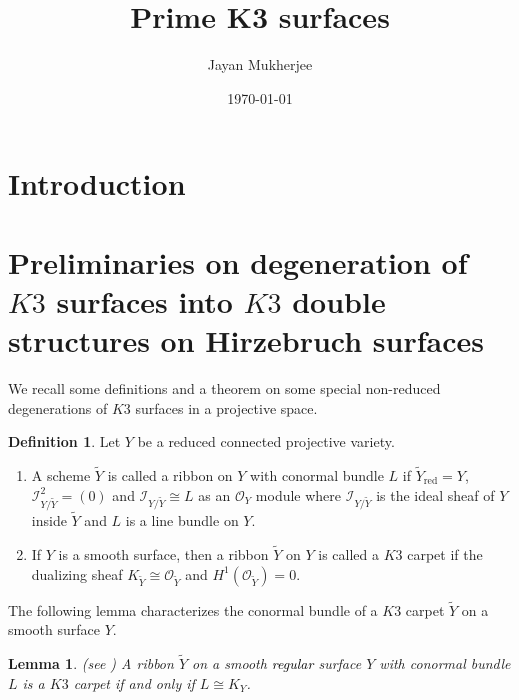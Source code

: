 \documentclass[11pt,reqno]{amsart}
\title{Prime K3 surfaces}
\author{Jayan Mukherjee}
\date{\today}
\theoremstyle{plain}
\newtheorem{lemma}[theorem]{Lemma}
\theoremstyle{definition}
\newtheorem{definition}[theorem]{Definition}
\begin{document}
\begin{abstract}
\end{abstract}

\maketitle

\section{Introduction}


\section{Preliminaries on degeneration of $K3$ surfaces into $K3$ double structures on Hirzebruch surfaces}

We recall some definitions and a theorem on some special non-reduced degenerations of $K3$ surfaces in a projective space.

\begin{definition}\label{ribbon}
Let $Y$ be a reduced connected projective variety.
 \begin{enumerate}
     \item A scheme $\widetilde{Y}$ is called a ribbon on $Y$ with conormal bundle $L$ if $\widetilde{Y}_{\operatorname{red}} = Y$, $\mathcal{I}_{Y/\widetilde{Y}}^2 = (0)$ and $\mathcal{I}_{Y/\widetilde{Y}} \cong L$ as an $\mathcal{O}_Y$ module where $\mathcal{I}_{Y/\widetilde{Y}}$ is the ideal sheaf of $Y$ inside $\widetilde{Y}$ and $L$ is a line bundle on $Y$. 

     \item If $Y$ is a smooth surface, then a ribbon $\widetilde{Y}$ on $Y$ is called a $K3$ carpet if the dualizing sheaf $K_{\widetilde{Y}} \cong \mathcal{O}_{\widetilde{Y}}$ and $H^1(\mathcal{O}_{\widetilde{Y}})= 0$.

\end{enumerate}
\end{definition}  

The following lemma characterizes the conormal bundle of a $K3$ carpet $\widetilde{Y}$ on a smooth surface $Y$.

\begin{lemma}(see \cite[\textcolor{black}{Proposition $1.5$}]{GGP08})
    A ribbon $\widetilde{Y}$ on a smooth \textcolor{black}{regular} surface $Y$ with conormal bundle $L$ is a $K3$ carpet if and only if $L \cong K_Y$.
\end{lemma}
\end{document}
